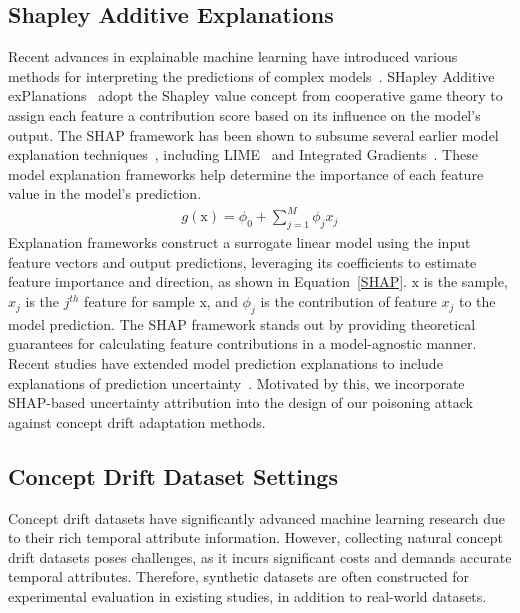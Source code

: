 \documentclass[conference,compsoc]{IEEEtran} %
\begin{document}
\subsection{Shapley Additive Explanations}
\label{Sec: Shapley Additive Explanations}
Recent advances in explainable machine learning have introduced various methods for interpreting the predictions of complex models~\cite{ali2023explainable}.
SHapley Additive exPlanations~\cite{lundberg2017unified} adopt the Shapley value concept from cooperative game theory to assign each feature a contribution score based on its influence on the model's output.
The SHAP framework has been shown to subsume several earlier model explanation techniques~\cite{2021-Usenix-Poisoning-Attack-Explanation-guided-Backdoor}, including LIME~\cite{ribeiro2016should} and Integrated Gradients~\cite{sundararajan2017axiomatic}. 
These model explanation frameworks help determine the importance of each feature value in the model's prediction.
\begin{equation}
	\begin{aligned}
			g(\bm{\mathrm{x}}) = \phi_{0} + \sum_{j=1}^{M} \phi_{j} x_{j}
		\end{aligned}
	\label{SHAP}
\end{equation}
Explanation frameworks construct a surrogate linear model using the input feature vectors and output predictions, leveraging its coefficients to estimate feature importance and direction, as shown in Equation~\ref{SHAP}.
$\bm{\mathrm{x}}$ is the sample, $x_{j}$ is the $j^{th}$ feature for sample $\bm{\mathrm{x}}$, and $\phi_{j}$ is the contribution of feature $x_{j}$ to the model  prediction.
The SHAP framework stands out by providing theoretical guarantees for calculating feature contributions in a model-agnostic manner.
Recent studies have extended model prediction explanations to include explanations of prediction uncertainty~\cite{NEURIPS2023_16e4be78}.
Motivated by this, we incorporate SHAP-based uncertainty attribution into the design of our poisoning attack against concept drift adaptation methods.

\subsection{Concept Drift Dataset Settings}
\label{Sec: Concept Drift Dataset Settings}
Concept drift datasets have significantly advanced machine learning research due to their rich temporal attribute information.
However, collecting natural concept drift datasets poses challenges, as it incurs significant costs and demands accurate temporal attributes.
Therefore, synthetic datasets are often constructed for experimental evaluation in existing studies, in addition to real-world datasets.
\end{document}
